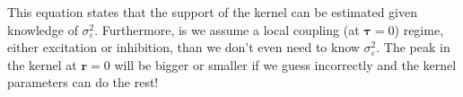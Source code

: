 \documentclass[]{article}
\begin{document}
This equation states that the support of the kernel can be estimated given knowledge of $\sigma_\varepsilon^2$. Furthermore, is we assume a local coupling (at $\boldsymbol\tau=0$) regime, either excitation or inhibition, than we don't even need to know $\sigma_\varepsilon^2$. The peak in the kernel at $\mathbf{r}=0$ will be bigger or smaller if we guess incorrectly and the kernel parameters can do the rest! 


\end{document}
